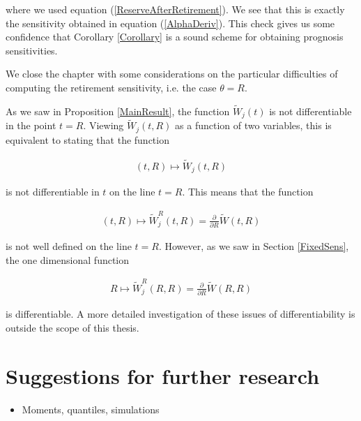 \documentclass{article}
\newcommand{\1}[1]{\mathbbm{1}_{\left\lbrace #1 \right\rbrace}}
\theoremstyle{break}
\theoremstyle{remark}
\newenvironment{remark}
  {\pushQED{\qed}\renewcommand{\qedsymbol}{\scalebox{1.4}{$\circ$}}\remarkx}
  {\popQED\endremarkx}
\numberwithin{equation}{section}
\begin{document}
\begin{example}
	where we used equation (\ref{ReserveAfterRetirement}). We see that this is exactly the sensitivity obtained in equation (\ref{AlphaDeriv}). This check gives us some confidence that Corollary \ref{Corollary} is a sound scheme for obtaining prognosis sensitivities.
\end{example}

We close the chapter with some considerations on the particular difficulties of computing the retirement sensitivity, i.e. the case $\theta=R$.

\begin{remark} \label{CloseRemark}
As we saw in Proposition \ref{MainResult}, the function $\tilde{W}_j(t)$ is not differentiable in the point $t=R$. Viewing $\tilde{W}_j(t,R)$ as a function of two variables, this is equivalent to stating that the function

\begin{align*}
	(t,R) \mapsto \tilde{W}_j(t,R)
\end{align*}

is not differentiable in $t$ on the line $t=R$. This means that the function

\begin{align*}
	(t,R) \mapsto \tilde{W}_j^R(t,R) = \frac{\partial}{\partial R} \tilde{W}(t,R)
\end{align*}

is not well defined on the line $t=R$. However, as we saw in Section \ref{FixedSens}, the one dimensional function

\begin{align*}
	R \mapsto \tilde{W}_j^R(R,R) = \frac{\partial}{\partial R} \tilde{W}(R,R)
\end{align*}

is differentiable. A more detailed investigation of these issues of differentiability is outside the scope of this thesis.
\end{remark}

\newpage
\section{Suggestions for further research}

\begin{itemize}
	\item Moments, quantiles, simulations
\end{itemize}

\newpage



\end{document}
